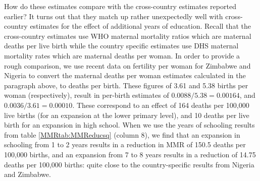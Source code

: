 \documentclass{article}[12pt,subeqn]
\begin{document}
\begin{spacing}{1.4}
How do these estimates compare with the cross-country estimates reported earlier? 
It turns out that they match up rather unexpectedly well with cross-country 
estimates for the effect of additional years of education. Recall that the 
cross-country estimates use WHO maternal mortality ratios which are maternal 
deaths per live birth while the country specific estimates use DHS maternal 
mortality rates which are maternal deaths per woman.  In order to provide a rough 
comparison, we use recent data \citep{CIA2012} on fertility per woman for Zimbabwe 
and Nigeria to convert the maternal deaths per woman estimates calculated in the 
paragraph above, to deaths per birth.  These figures of 3.61 and 5.38 births per 
woman (respectively), result in per-birth estimates of $0.0088/5.38=0.00164$, and 
$0.0036/3.61=0.00010$.  These correspond to an effect of 164 deaths per 100,000 
live births (for an expansion at the lower primary level), and 10 deaths per live 
birth for an expansion in high school.  When we use the years of schooling results 
from table \ref{MMRtab:MMReducsq} (column 8), we find that an expansion in 
schooling from 1 to 2 years results in a reduction in MMR of 150.5 deaths per 
100,000 births, and an expansion from 7 to 8 years results in a reduction of 
14.75 deaths per 100,000 births: quite close to the country-specific results 
from Nigeria and Zimbabwe. 


\end{spacing}
\end{document}
